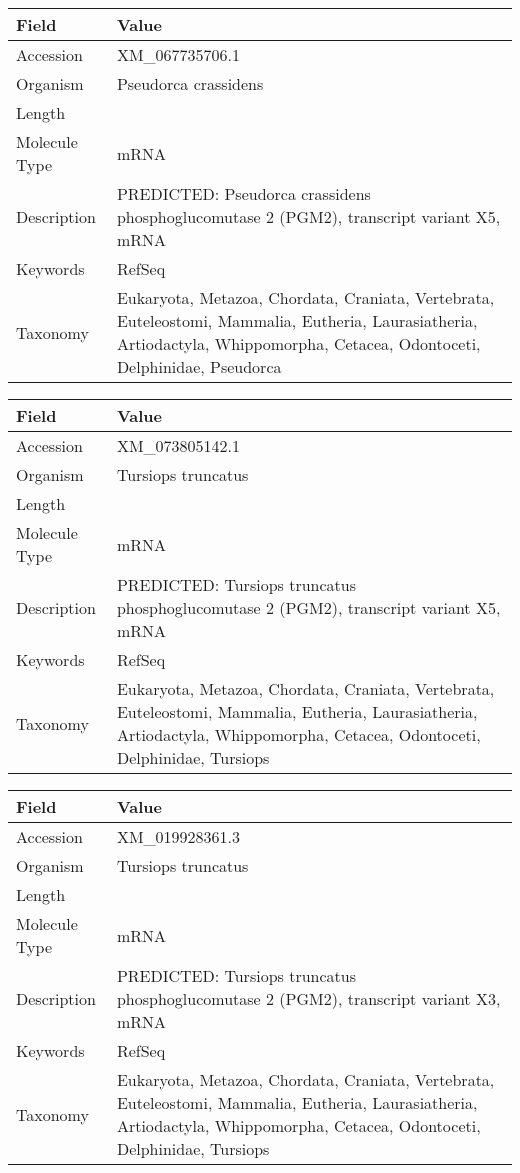 \documentclass[10pt]{article}
\begin{document}
\vspace{1em}
{\footnotesize
\begin{longtable}{>{\raggedright\arraybackslash}p{4.5cm} >{\raggedright\arraybackslash}p{11.5cm}}
\textbf{Field} & \textbf{Value} \\
\hline
Accession & XM\_067735706.1 \\
Organism & Pseudorca crassidens \\
Length & 12568 \\
Molecule Type & mRNA \\
Description & PREDICTED: Pseudorca crassidens phosphoglucomutase 2 (PGM2), transcript variant X5, mRNA \\
Keywords & RefSeq \\
Taxonomy & Eukaryota, Metazoa, Chordata, Craniata, Vertebrata, Euteleostomi, Mammalia, Eutheria, Laurasiatheria, Artiodactyla, Whippomorpha, Cetacea, Odontoceti, Delphinidae, Pseudorca \\
\end{longtable}
}

\vspace{1em}
{\footnotesize
\begin{longtable}{>{\raggedright\arraybackslash}p{4.5cm} >{\raggedright\arraybackslash}p{11.5cm}}
\textbf{Field} & \textbf{Value} \\
\hline
Accession & XM\_073805142.1 \\
Organism & Tursiops truncatus \\
Length & 3301 \\
Molecule Type & mRNA \\
Description & PREDICTED: Tursiops truncatus phosphoglucomutase 2 (PGM2), transcript variant X5, mRNA \\
Keywords & RefSeq \\
Taxonomy & Eukaryota, Metazoa, Chordata, Craniata, Vertebrata, Euteleostomi, Mammalia, Eutheria, Laurasiatheria, Artiodactyla, Whippomorpha, Cetacea, Odontoceti, Delphinidae, Tursiops \\
\end{longtable}
}

\vspace{1em}
{\footnotesize
\begin{longtable}{>{\raggedright\arraybackslash}p{4.5cm} >{\raggedright\arraybackslash}p{11.5cm}}
\textbf{Field} & \textbf{Value} \\
\hline
Accession & XM\_019928361.3 \\
Organism & Tursiops truncatus \\
Length & 3329 \\
Molecule Type & mRNA \\
Description & PREDICTED: Tursiops truncatus phosphoglucomutase 2 (PGM2), transcript variant X3, mRNA \\
Keywords & RefSeq \\
Taxonomy & Eukaryota, Metazoa, Chordata, Craniata, Vertebrata, Euteleostomi, Mammalia, Eutheria, Laurasiatheria, Artiodactyla, Whippomorpha, Cetacea, Odontoceti, Delphinidae, Tursiops \\
\end{longtable}
}
\end{document}

